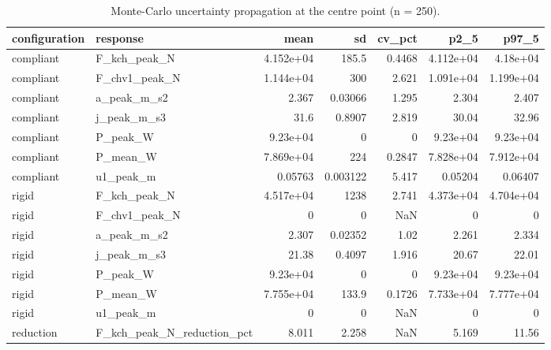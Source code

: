\begin{table}
\caption{Monte-Carlo uncertainty propagation at the centre point (n = 250).}
\label{tab:table12_uncertainty}
\begin{tabular}{llrrrrr}
\toprule
configuration & response & mean & sd & cv\_pct & p2\_5 & p97\_5 \\
\midrule
compliant & F\_kch\_peak\_N & 4.152e+04 & 185.5 & 0.4468 & 4.112e+04 & 4.18e+04 \\
compliant & F\_chv1\_peak\_N & 1.144e+04 & 300 & 2.621 & 1.091e+04 & 1.199e+04 \\
compliant & a\_peak\_m\_s2 & 2.367 & 0.03066 & 1.295 & 2.304 & 2.407 \\
compliant & j\_peak\_m\_s3 & 31.6 & 0.8907 & 2.819 & 30.04 & 32.96 \\
compliant & P\_peak\_W & 9.23e+04 & 0 & 0 & 9.23e+04 & 9.23e+04 \\
compliant & P\_mean\_W & 7.869e+04 & 224 & 0.2847 & 7.828e+04 & 7.912e+04 \\
compliant & u1\_peak\_m & 0.05763 & 0.003122 & 5.417 & 0.05204 & 0.06407 \\
rigid & F\_kch\_peak\_N & 4.517e+04 & 1238 & 2.741 & 4.373e+04 & 4.704e+04 \\
rigid & F\_chv1\_peak\_N & 0 & 0 & NaN & 0 & 0 \\
rigid & a\_peak\_m\_s2 & 2.307 & 0.02352 & 1.02 & 2.261 & 2.334 \\
rigid & j\_peak\_m\_s3 & 21.38 & 0.4097 & 1.916 & 20.67 & 22.01 \\
rigid & P\_peak\_W & 9.23e+04 & 0 & 0 & 9.23e+04 & 9.23e+04 \\
rigid & P\_mean\_W & 7.755e+04 & 133.9 & 0.1726 & 7.733e+04 & 7.777e+04 \\
rigid & u1\_peak\_m & 0 & 0 & NaN & 0 & 0 \\
reduction & F\_kch\_peak\_N\_reduction\_pct & 8.011 & 2.258 & NaN & 5.169 & 11.56 \\
\bottomrule
\end{tabular}
\end{table}
